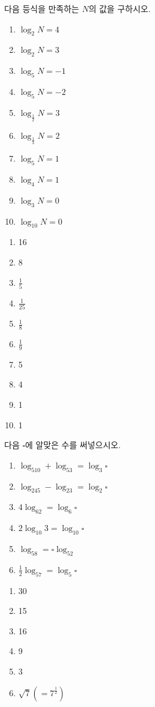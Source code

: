 \documentclass[a4paper]{oblivoir}
\begin{document}
\begin{Exercise}
다음 등식을 만족하는 \(N\)의 값을 구하시오.
\begin{enumerate}[(1)]
\item
\(\log_2N=4\)
\item
\(\log_2N=3\)
\item
\(\log_5N=-1\)
\item
\(\log_5N=-2\)
\item
\(\log_{\frac12}N=3\)
\item
\(\log_{\frac13}N=2\)
\item
\(\log_5N=1\)
\item
\(\log_4N=1\)
\item
\(\log_3N=0\)
\item
\(\log_{10}N=0\)
\end{enumerate}
\end{Exercise}

\begin{Answer}
\begin{enumerate}[(1)]
\item
16
\item
8
\item
\(\frac15\)
\item
\(\frac1{25}\)
\item
\(\frac18\)
\item
\(\frac19\)
\item
5
\item
4
\item
1
\item
1
\end{enumerate}
\end{Answer}

\begin{Exercise}
다음 \(\square\)에 알맞은 수를 써넣으시오.
\begin{enumerate}[(1)]
\item
\(\log_510+\log_53=\log_3\square\)
\item
\(\log_245-\log_23=\log_2\square\)
\item
\(4\log_62=\log_6\square\)
\item
\(2\log_{10}3=\log_{10}\square\)
\item
\(\log_58=\square\log_52\)
\item
\(\frac12\log_57=\log_5\square\)
\end{enumerate}
\end{Exercise}

\begin{Answer}
\begin{enumerate}[(1)]
\item
30
\item
15
\item
16
\item
9
\item
3
\item
\(\sqrt7(=7^{\frac12})\)
\end{enumerate}
\end{Answer}
\end{document}
